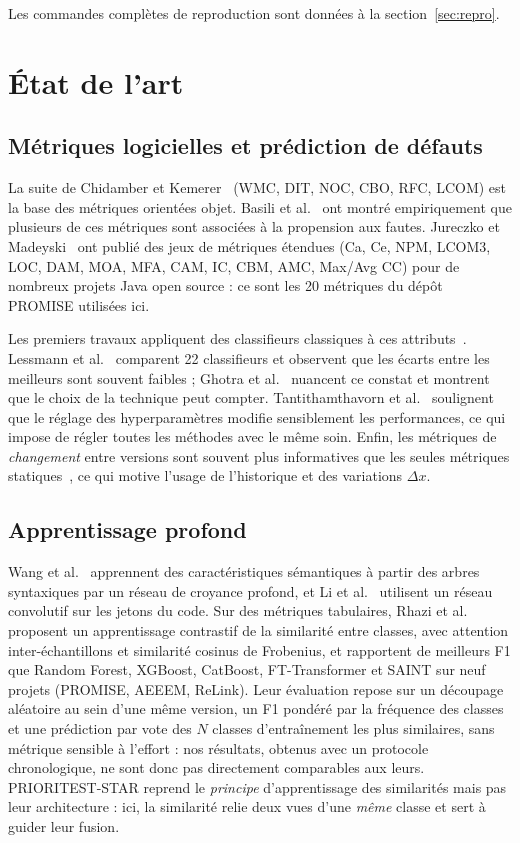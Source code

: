 \documentclass[11pt,a4paper,openany]{report}
\begin{document}
\noindent Les commandes complètes de reproduction sont données à la section~\ref{sec:repro}.

\chapter{État de l'art}

\section{Métriques logicielles et prédiction de défauts}
La suite de Chidamber et Kemerer~\cite{ck1994} (WMC, DIT, NOC, CBO, RFC, LCOM) est la base des métriques orientées
objet. Basili et al.~\cite{basili1996} ont montré empiriquement que plusieurs de ces métriques sont associées à la
propension aux fautes. Jureczko et Madeyski~\cite{jureczko2010} ont publié des jeux de métriques étendues (Ca, Ce,
NPM, LCOM3, LOC, DAM, MOA, MFA, CAM, IC, CBM, AMC, Max/Avg CC) pour de nombreux projets Java open source : ce sont
les 20 métriques du dépôt PROMISE utilisées ici.

Les premiers travaux appliquent des classifieurs classiques à ces attributs~\cite{menzies2007}.
Lessmann et al.~\cite{lessmann2008} comparent 22 classifieurs et observent que les écarts entre les meilleurs sont
souvent faibles ; Ghotra et al.~\cite{ghotra2015} nuancent ce constat et montrent que le choix de la technique peut
compter. Tantithamthavorn et al.~\cite{tantithamthavorn2016} soulignent que le réglage des hyperparamètres modifie
sensiblement les performances, ce qui impose de régler toutes les méthodes avec le même soin. Enfin, les métriques de
\emph{changement} entre versions sont souvent plus informatives que les seules métriques statiques~\cite{moser2008},
ce qui motive l'usage de l'historique et des variations $\Delta x$.

\section{Apprentissage profond}
Wang et al.~\cite{wang2016} apprennent des caractéristiques sémantiques à partir des arbres syntaxiques par un réseau
de croyance profond, et Li et al.~\cite{li2017} utilisent un réseau convolutif sur les jetons du code.
Sur des métriques tabulaires, Rhazi et al.~\cite{rhazi2026} proposent un apprentissage contrastif de la similarité
entre classes, avec attention inter-échantillons et similarité cosinus de Frobenius, et rapportent de meilleurs F1
que Random Forest, XGBoost, CatBoost, FT-Transformer et SAINT sur neuf projets (PROMISE, AEEEM, ReLink).
Leur évaluation repose sur un découpage aléatoire au sein d'une même version, un F1 pondéré par la fréquence des
classes et une prédiction par vote des $N$ classes d'entraînement les plus similaires, sans métrique sensible à
l'effort : nos résultats, obtenus avec un protocole chronologique, ne sont donc pas directement comparables aux leurs.
PRIORITEST-STAR reprend le \emph{principe} d'apprentissage des similarités mais pas leur architecture : ici, la
similarité relie deux vues d'une \emph{même} classe et sert à guider leur fusion.
\end{document}
